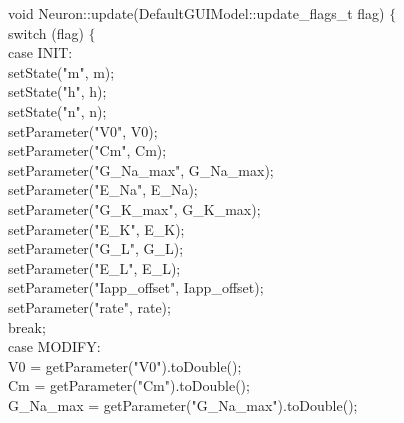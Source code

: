 \begin{maxipage}
\begin{example}
void Neuron::update(DefaultGUIModel::update\_flags\_t flag) $\{$\\
\hspace{.5cm}switch (flag) $\{$\\
\hspace{1cm}case INIT:\\
\hspace{1.5cm}setState("m", m);\\
\hspace{1.5cm}setState("h", h);\\
\hspace{1.5cm}setState("n", n);\\
\hspace{1.5cm}setParameter("V0", V0);\\
\hspace{1.5cm}setParameter("Cm", Cm);\\
\hspace{1.5cm}setParameter("G\_Na\_max", G\_Na\_max);\\
\hspace{1.5cm}setParameter("E\_Na", E\_Na);\\
\hspace{1.5cm}setParameter("G\_K\_max", G\_K\_max);\\
\hspace{1.5cm}setParameter("E\_K", E\_K);\\
\hspace{1.5cm}setParameter("G\_L", G\_L);\\
\hspace{1.5cm}setParameter("E\_L", E\_L);\\
\hspace{1.5cm}setParameter("Iapp\_offset", Iapp\_offset);\\
\hspace{1.5cm}setParameter("rate", rate);\\
\hspace{1.5cm}break;\\
\hspace{1cm}case MODIFY:\\
\hspace{1.5cm}V0 = getParameter("V0").toDouble();\\
\hspace{1.5cm}Cm = getParameter("Cm").toDouble();\\
\hspace{1.5cm}G\_Na\_max = getParameter("G\_Na\_max").toDouble();\\

\end{example}
\end{maxipage}
